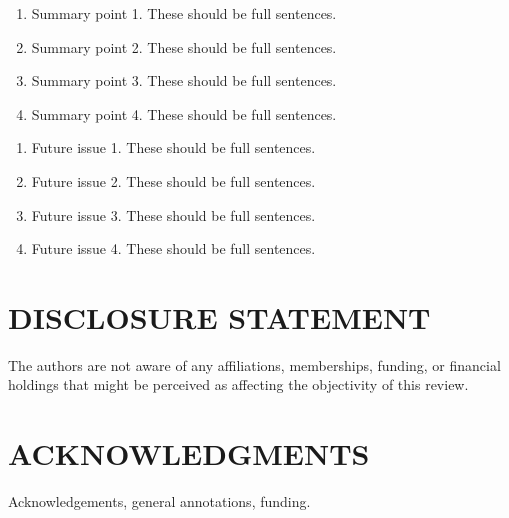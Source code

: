 \documentclass[letterpaper]{ar-1col}
\begin{document}
\begin{summary}
  \begin{enumerate}
    \item Summary point 1. These should be full sentences.
    \item Summary point 2. These should be full sentences.
    \item Summary point 3. These should be full sentences.
    \item Summary point 4. These should be full sentences.
  \end{enumerate}
\end{summary}

\begin{issues}
  \begin{enumerate}
    \item Future issue 1. These should be full sentences.
    \item Future issue 2. These should be full sentences.
    \item Future issue 3. These should be full sentences.
    \item Future issue 4. These should be full sentences.
  \end{enumerate}
\end{issues}

\section*{DISCLOSURE STATEMENT}
The authors are not aware of any affiliations, memberships, funding, or financial holdings that
might be perceived as affecting the objectivity of this review.

\section*{ACKNOWLEDGMENTS}
Acknowledgements, general annotations, funding.

%



\end{document}
